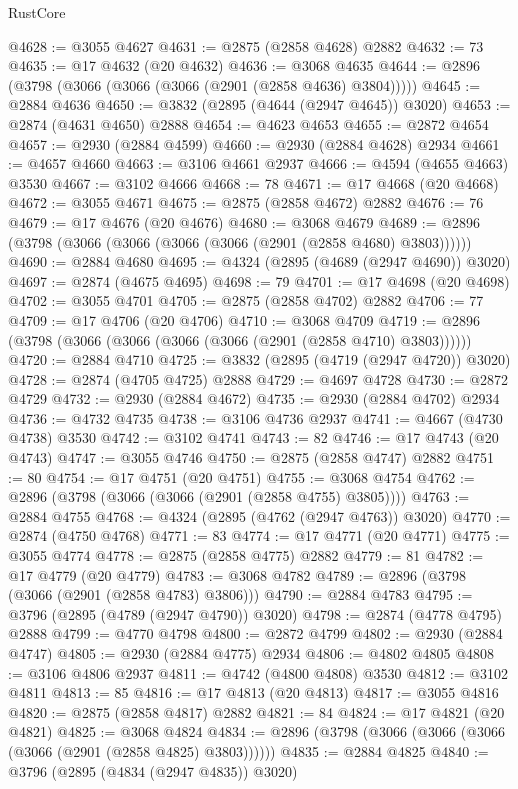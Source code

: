 \begin{lexlean}{RustCore}
\begin{coremodule}
@4628 := @3055 @4627
@4631 := @2875 (@2858 @4628) @2882
@4632 := 73
@4635 := @17 @4632 (@20 @4632)
@4636 := @3068 @4635
@4644 := @2896 (@3798 (@3066 (@3066 (@3066 (@2901 (@2858 @4636) @3804)))))
@4645 := @2884 @4636
@4650 := @3832 (@2895 (@4644 (@2947 @4645)) @3020)
@4653 := @2874 (@4631 @4650) @2888
@4654 := @4623 @4653
@4655 := @2872 @4654
@4657 := @2930 (@2884 @4599)
@4660 := @2930 (@2884 @4628) @2934
@4661 := @4657 @4660
@4663 := @3106 @4661 @2937
@4666 := @4594 (@4655 @4663) @3530
@4667 := @3102 @4666
@4668 := 78
@4671 := @17 @4668 (@20 @4668)
@4672 := @3055 @4671
@4675 := @2875 (@2858 @4672) @2882
@4676 := 76
@4679 := @17 @4676 (@20 @4676)
@4680 := @3068 @4679
@4689 := @2896 (@3798 (@3066 (@3066 (@3066 (@3066 (@2901 (@2858 @4680) @3803))))))
@4690 := @2884 @4680
@4695 := @4324 (@2895 (@4689 (@2947 @4690)) @3020)
@4697 := @2874 (@4675 @4695)
@4698 := 79
@4701 := @17 @4698 (@20 @4698)
@4702 := @3055 @4701
@4705 := @2875 (@2858 @4702) @2882
@4706 := 77
@4709 := @17 @4706 (@20 @4706)
@4710 := @3068 @4709
@4719 := @2896 (@3798 (@3066 (@3066 (@3066 (@3066 (@2901 (@2858 @4710) @3803))))))
@4720 := @2884 @4710
@4725 := @3832 (@2895 (@4719 (@2947 @4720)) @3020)
@4728 := @2874 (@4705 @4725) @2888
@4729 := @4697 @4728
@4730 := @2872 @4729
@4732 := @2930 (@2884 @4672)
@4735 := @2930 (@2884 @4702) @2934
@4736 := @4732 @4735
@4738 := @3106 @4736 @2937
@4741 := @4667 (@4730 @4738) @3530
@4742 := @3102 @4741
@4743 := 82
@4746 := @17 @4743 (@20 @4743)
@4747 := @3055 @4746
@4750 := @2875 (@2858 @4747) @2882
@4751 := 80
@4754 := @17 @4751 (@20 @4751)
@4755 := @3068 @4754
@4762 := @2896 (@3798 (@3066 (@3066 (@2901 (@2858 @4755) @3805))))
@4763 := @2884 @4755
@4768 := @4324 (@2895 (@4762 (@2947 @4763)) @3020)
@4770 := @2874 (@4750 @4768)
@4771 := 83
@4774 := @17 @4771 (@20 @4771)
@4775 := @3055 @4774
@4778 := @2875 (@2858 @4775) @2882
@4779 := 81
@4782 := @17 @4779 (@20 @4779)
@4783 := @3068 @4782
@4789 := @2896 (@3798 (@3066 (@2901 (@2858 @4783) @3806)))
@4790 := @2884 @4783
@4795 := @3796 (@2895 (@4789 (@2947 @4790)) @3020)
@4798 := @2874 (@4778 @4795) @2888
@4799 := @4770 @4798
@4800 := @2872 @4799
@4802 := @2930 (@2884 @4747)
@4805 := @2930 (@2884 @4775) @2934
@4806 := @4802 @4805
@4808 := @3106 @4806 @2937
@4811 := @4742 (@4800 @4808) @3530
@4812 := @3102 @4811
@4813 := 85
@4816 := @17 @4813 (@20 @4813)
@4817 := @3055 @4816
@4820 := @2875 (@2858 @4817) @2882
@4821 := 84
@4824 := @17 @4821 (@20 @4821)
@4825 := @3068 @4824
@4834 := @2896 (@3798 (@3066 (@3066 (@3066 (@3066 (@2901 (@2858 @4825) @3803))))))
@4835 := @2884 @4825
@4840 := @3796 (@2895 (@4834 (@2947 @4835)) @3020)

\end{coremodule}
\end{lexlean}
